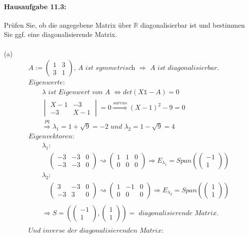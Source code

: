 \documentclass[titlepage]{article}
\newcommand{\R}{\mathbb{R}}
\newcommand{\1}{\mathbb{1}}
\newcommand{\0}{\mathbb{0}}
\newcommand{\matrixZ}[4]{\begin{pmatrix}#1&#2\\#3&#4\end{pmatrix}}
\newcommand{\detZ}[4]{\begin{vmatrix}#1&#2\\#3&#4\end{vmatrix}}
\newcommand{\vecZ}[2]{\left(\begin{smallmatrix}#1\\#2\end{smallmatrix}\right)}
\begin{document}
	\newpage
	\paragraph{Hausaufgabe 11.3:} Prüfen Sie, ob die angegebene Matrix über $\R$ diagonalisierbar ist und bestimmen Sie ggf. eine diagonalisierende Matrix.\\\\
		(a)
			\begin{align*}
				&A:=\matrixZ{1}{3}{3}{1}\textit{, A ist symmetrisch }\Rightarrow\textit{ A ist diagonalisierbar.}\\
				&\textit{Eigenwerte: }\\
				&\quad\quad\lambda\textit{ ist Eigenwert von A }\Leftrightarrow det(X\1-A)=0\\
				&\quad\quad\detZ{X-1}{-3}{-3}{X-1}=0\overset{sarrus}{\Rightarrow}(X-1)^2-9=0\\
				&\quad\quad\overset{pq}{\Rightarrow}\lambda_1=1+\sqrt{9}=-2\textit{ und }\lambda_2=1-\sqrt{9}=4\\
				&\textit{Eigenvektoren: }\\
				&\quad\quad\lambda_1:\\
				&\quad\quad\quad
				\left(\begin{array}{cc|c}
					-3&-3&0\\-3&-3&0
				\end{array}\right)
				\rightsquigarrow
				\left(\begin{array}{cc|c}
					1&1&0\\0&0&0
				\end{array}\right)
				\Rightarrow E_{\lambda_1}=Span(\vecZ{-1}{1})\\
				&\quad\quad\lambda_2:\\
				&\quad\quad\quad
				\left(\begin{array}{cc|c}
					3&-3&0\\-3&3&0
				\end{array}\right)
				\rightsquigarrow
				\left(\begin{array}{cc|c}
					1&-1&0\\0&0&0
				\end{array}\right)
				\Rightarrow E_{\lambda_2}=Span(\vecZ{1}{1})\\\\
				&\quad\quad\Rightarrow S=(\vecZ{-1}{1},\vecZ{1}{1})=\textit{ diagonalisierende Matrix.}\\\\
				&\textit{Und inverse der diagonalisierenden Matrix:}\\

\end{align*}
\end{document}
